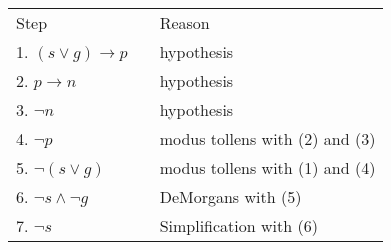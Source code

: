 \documentclass[12pt,addpoints]{exam}
\newcommand{\ra}{\rightarrow}
\begin{document}
\begin{questions}
\begin{solution}
        \begin{tabular}{lll}
        Step    & \hspace{0.2in} & Reason \\
        1. $(s \vee g) \ra p$           & & hypothesis \\
        2. $p \ra n$                    & & hypothesis \\
        3. $\neg n$                     & & hypothesis \\
        4. $\neg p$                     & & modus tollens with (2) and (3) \\
        5. $\neg (s \vee g)$            & & modus tollens with (1) and (4) \\
        6. $\neg s \wedge \neg g$       & & DeMorgans with (5) \\
        7. $\neg s$                     & & Simplification with (6)
        \end{tabular}
\end{solution}


\end{questions}
\end{document}
